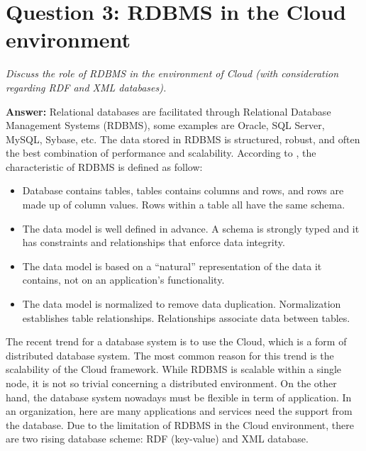 \documentclass[a4paper,12pt]{article}
\begin{document}


\section*{Question 3: RDBMS in the Cloud environment}
\setcounter{section}{1}

\textit{Discuss the role of RDBMS in the environment of Cloud (with consideration regarding RDF and XML databases).} 

\vspace{1.5em}
\noindent
\textbf{Answer:} 
\noindent
Relational databases are facilitated through Relational Database Management Systems (RDBMS), some examples are Oracle, SQL Server, MySQL, Sybase, etc. The data stored in RDBMS is structured, robust, and often the best combination of performance and scalability. According to \cite{doom}, the characteristic of RDBMS is defined as follow:
\begin{itemize}
    \setlength{\itemsep}{0cm}
    \setlength{\parskip}{0cm}
    \item Database contains tables, tables contains columns and rows, and rows are made up of column values. Rows within a table all have the same schema.
    \item The data model is well defined in advance. A schema is strongly typed and it has constraints and relationships that enforce data integrity.
    \item The data model is based on a ``natural'' representation of the data it contains, not on an application's functionality.
    \item The data model is normalized to remove data duplication. Normalization establishes table relationships. Relationships associate data between tables.
\end{itemize}
The recent trend for a database system is to use the Cloud, which is a form of distributed database system. The most common reason for this trend is the scalability of the Cloud framework. While RDBMS is scalable within a single node, it is not so trivial concerning a distributed environment. On the other hand, the database system nowadays must be flexible in term of application. In an organization, here are many applications and services need the support from the database. Due to the limitation of RDBMS in the Cloud environment, there are two rising database scheme: RDF (key-value) and XML database.
\end{document}
